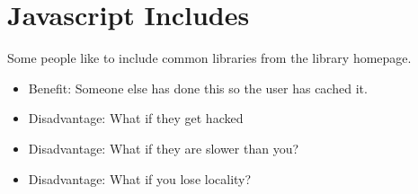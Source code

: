 \documentclass[../CMPUT-404-Notes.tex]{subfiles}
\begin{document}
\section{Javascript Includes}
Some people like to include common libraries
from the library homepage.
\begin{itemize}
    \item Benefit: Someone else has done this so the user has cached it.
    \item Disadvantage: What if they get hacked
    \item Disadvantage: What if they are slower than you?
    \item Disadvantage: What if you lose locality?
\end{itemize}
\end{document}

